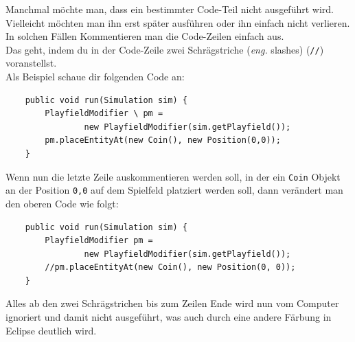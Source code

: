 \label{auskommentieren}
\begin{Infobox}
    Manchmal möchte man, dass ein bestimmter Code-Teil nicht ausgeführt wird.
    Vielleicht möchten man ihn erst später ausführen oder ihn einfach nicht verlieren.
    In solchen Fällen Kommentieren man die Code-Zeilen einfach aus.\\
    Das geht, indem du in der Code-Zeile zwei Schrägstriche (\emph{eng.} slashes) (\lstinline{//}) voranstellst.\\
    Als Beispiel schaue dir folgenden Code an:\\

    \hfill
    \begin{minipage}{0.96\textwidth}
        \begin{lstlisting}
    public void run(Simulation sim) {
        PlayfieldModifier \ pm =
                new PlayfieldModifier(sim.getPlayfield());
        pm.placeEntityAt(new Coin(), new Position(0,0));
    }
        \end{lstlisting}
    \end{minipage}

    Wenn nun die letzte Zeile auskommentieren werden soll, in der ein \lstinline{Coin} Objekt an der Position \lstinline{0,0} auf dem Spielfeld platziert werden soll, dann verändert man den oberen Code wie folgt:\\

    \hfill
    \begin{minipage}{.96\textwidth}
        \begin{lstlisting}
    public void run(Simulation sim) {
        PlayfieldModifier pm =
                new PlayfieldModifier(sim.getPlayfield());
        //pm.placeEntityAt(new Coin(), new Position(0, 0));
    }
        \end{lstlisting}
    \end{minipage}

    Alles ab den zwei Schrägstrichen bis zum Zeilen Ende wird nun vom Computer ignoriert und damit nicht ausgeführt, was auch durch eine andere Färbung in Eclipse deutlich wird.
\end{Infobox}


